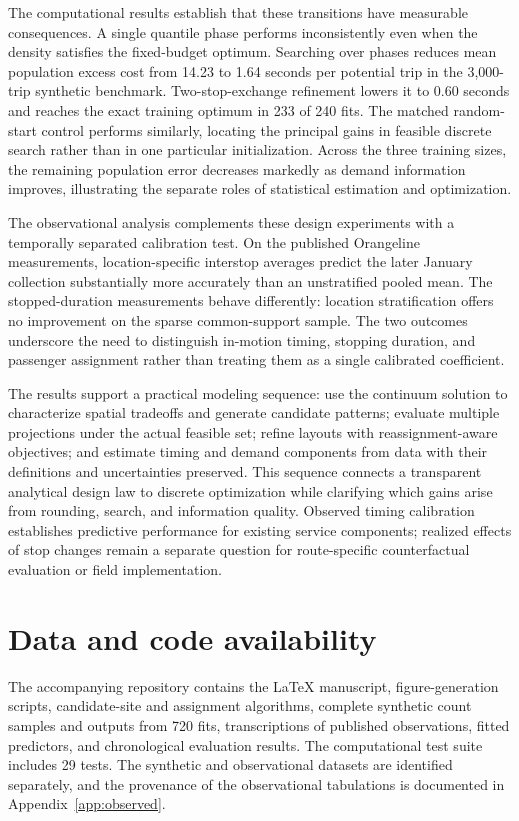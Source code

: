 \documentclass[11pt]{article}
\theoremstyle{remark}\newtheorem{remark}[theorem]{Remark}
\begin{document}
The computational results establish that these transitions have measurable consequences. A single quantile phase performs inconsistently even when the density satisfies the fixed-budget optimum. Searching over phases reduces mean population excess cost from 14.23 to 1.64 seconds per potential trip in the 3,000-trip synthetic benchmark. Two-stop-exchange refinement lowers it to 0.60 seconds and reaches the exact training optimum in 233 of 240 fits. The matched random-start control performs similarly, locating the principal gains in feasible discrete search rather than in one particular initialization. Across the three training sizes, the remaining population error decreases markedly as demand information improves, illustrating the separate roles of statistical estimation and optimization.

The observational analysis complements these design experiments with a temporally separated calibration test. On the published Orangeline measurements, location-specific interstop averages predict the later January collection substantially more accurately than an unstratified pooled mean. The stopped-duration measurements behave differently: location stratification offers no improvement on the sparse common-support sample. The two outcomes underscore the need to distinguish in-motion timing, stopping duration, and passenger assignment rather than treating them as a single calibrated coefficient.

The results support a practical modeling sequence: use the continuum solution to characterize spatial tradeoffs and generate candidate patterns; evaluate multiple projections under the actual feasible set; refine layouts with reassignment-aware objectives; and estimate timing and demand components from data with their definitions and uncertainties preserved. This sequence connects a transparent analytical design law to discrete optimization while clarifying which gains arise from rounding, search, and information quality. Observed timing calibration establishes predictive performance for existing service components; realized effects of stop changes remain a separate question for route-specific counterfactual evaluation or field implementation.

\section*{Data and code availability}
The accompanying repository contains the LaTeX manuscript, figure-generation scripts, candidate-site and assignment algorithms, complete synthetic count samples and outputs from 720 fits, transcriptions of published observations, fitted predictors, and chronological evaluation results. The computational test suite includes 29 tests. The synthetic and observational datasets are identified separately, and the provenance of the observational tabulations is documented in Appendix~\ref{app:observed}.
\end{document}
